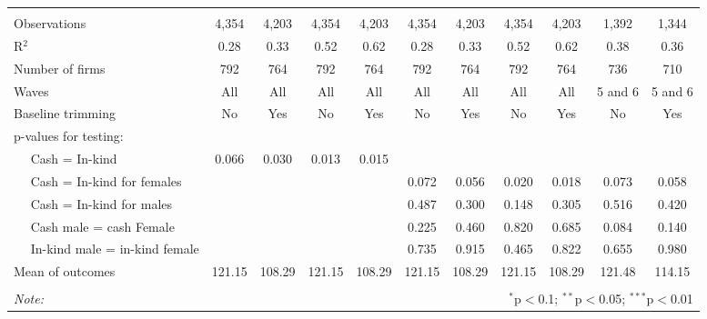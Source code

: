 \begin{table}[!htbp]
\begin{tabular}{@{\extracolsep{5pt}}lcccccccccc}
  & & & & & & & & & & \\ 
\hline \\[-1.8ex] 
Observations & 4,354 & 4,203 & 4,354 & 4,203 & 4,354 & 4,203 & 4,354 & 4,203 & 1,392 & 1,344 \\ 
R$^{2}$ & 0.28 & 0.33 & 0.52 & 0.62 & 0.28 & 0.33 & 0.52 & 0.62 & 0.38 & 0.36 \\ 
Number of firms & 792 & 764 & 792 & 764 & 792 & 764 & 792 & 764 & 736 & 710 \\ 
Waves & All & All & All & All & All & All & All & All & 5 and 6 & 5 and 6 \\ 
Baseline trimming & No & Yes & No & Yes & No & Yes & No & Yes & No & Yes \\ 
p-values for testing: &  &  &  &  &  &  &  &  &  &  \\ 
$\quad$  Cash = In-kind & 0.066 & 0.030 & 0.013 & 0.015 &  &  &  &  &  &  \\ 
$\quad$  Cash = In-kind for females &  &  &  &  & 0.072 & 0.056 & 0.020 & 0.018 & 0.073 & 0.058 \\ 
$\quad$  Cash = In-kind for males &  &  &  &  & 0.487 & 0.300 & 0.148 & 0.305 & 0.516 & 0.420 \\ 
$\quad$  Cash male = cash Female &  &  &  &  & 0.225 & 0.460 & 0.820 & 0.685 & 0.084 & 0.140 \\ 
$\quad$  In-kind male = in-kind female &  &  &  &  & 0.735 & 0.915 & 0.465 & 0.822 & 0.655 & 0.980 \\ 
Mean of outcomes & 121.15 & 108.29 & 121.15 & 108.29 & 121.15 & 108.29 & 121.15 & 108.29 & 121.48 & 114.15 \\ 
\hline \\[-1.8ex] 
\textit{Note:}  & \multicolumn{10}{r}{$^{*}$p$<$0.1; $^{**}$p$<$0.05; $^{***}$p$<$0.01} \\ 
\end{tabular} 
\end{table} 
